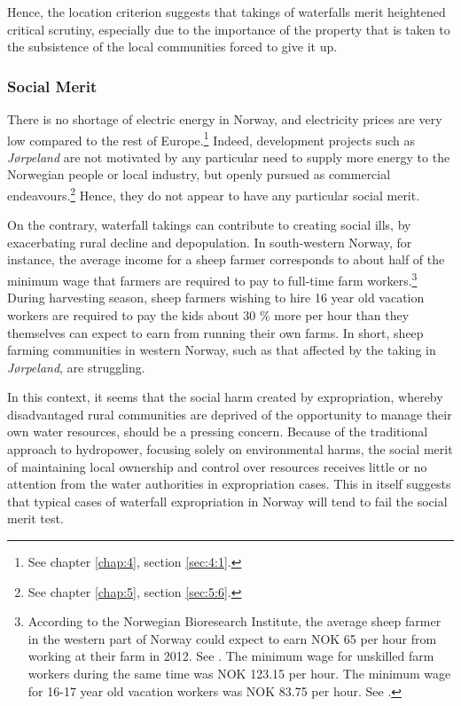 Hence, the location criterion suggests that takings of waterfalls merit heightened critical scrutiny, especially due to the importance of the property that is taken to the subsistence of the local communities forced to give it up.

\subsubsection{Social Merit}\label{sec:5:7:5}

There is no shortage of electric energy in Norway, and electricity prices are very low compared to the rest of Europe.\footnote{See chapter \ref{chap:4}, section \ref{sec:4:1}.} Indeed, development projects such as {\it Jørpeland} are not motivated by any particular need to supply more energy to the Norwegian people or local industry, but openly pursued as commercial endeavours.\footnote{See chapter \ref{chap:5}, section \ref{sec:5:6}.} Hence, they do not appear to have any particular social merit.

On the contrary, waterfall takings can contribute to creating social ills, by exacerbating rural decline and depopulation. In south-western Norway, for instance, the average income for a sheep farmer corresponds to about half of the minimum wage that farmers are required to pay to full-time farm workers.\footnote{According to the Norwegian Bioresearch Institute, the average sheep farmer in the western part of Norway could expect to earn NOK 65 per hour from working at their farm in 2012. See \cite[50]{smesdal14}. The minimum wage for unskilled farm workers during the same time was NOK 123.15 per hour. The minimum wage for 16-17 year old vacation workers was NOK 83.75 per hour. See \cite{tariff12}.} During harvesting season, sheep farmers wishing to hire 16 year old vacation workers are required to pay the kids about 30 \% more per hour than they themselves can expect to earn from running their own farms. In short, sheep farming communities in western Norway, such as that affected by the taking in {\it Jørpeland}, are struggling.

In this context, it seems that the social harm created by expropriation, whereby disadvantaged rural communities are deprived of the opportunity to manage their own water resources, should be a pressing concern. Because of the traditional approach to hydropower, focusing solely on environmental harms, the social merit of maintaining local ownership and control over resources receives little or no attention from the water authorities in expropriation cases. This in itself suggests that typical cases of waterfall expropriation in Norway will tend to fail the social merit test.

